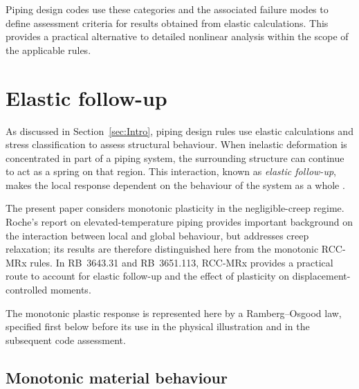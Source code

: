 \documentclass[10pt,a4paper]{article}
\let\oldsection\section
\newif\ifsectionstarted
\renewcommand{\section}{%
  \ifsectionstarted\clearpage\else\global\sectionstartedtrue\FloatBarrier\fi
  \oldsection}
\begin{document}
Piping design codes use these categories and the associated failure modes to define assessment criteria for results obtained from elastic calculations. This provides a practical alternative to detailed nonlinear analysis within the scope of the applicable rules.






\section{Elastic follow-up}
As discussed in Section~\ref{sec:Intro}, piping design rules use elastic calculations and stress classification to assess structural behaviour. When inelastic deformation is concentrated in part of a piping system, the surrounding structure can continue to act as a spring on that region. This interaction, known as \emph{elastic follow-up}, makes the local response dependent on the behaviour of the system as a whole \cite{RCCMRx,ASMEIII5}.

The present paper considers monotonic plasticity in the negligible-creep regime. Roche's report on elevated-temperature piping \cite{Roche1985} provides important background on the interaction between local and global behaviour, but addresses creep relaxation; its results are therefore distinguished here from the monotonic RCC-MRx rules. In RB~3643.31 and RB~3651.113, RCC-MRx provides a practical route to account for elastic follow-up and the effect of plasticity on displacement-controlled moments.

The monotonic plastic response is represented here by a Ramberg--Osgood law, specified first below before its use in the physical illustration and in the subsequent code assessment.

\subsection{Monotonic material behaviour}
\label{sec:RO}
\end{document}
